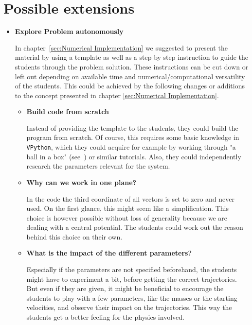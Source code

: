 \documentclass[12pt,ngerman,american]{iopart}
\newcommand{\vpython}[0]{\texttt{VPython}}
\begin{document}
\section{Possible extensions}\label{sec:extensions}

\begin{itemize}

\item \textbf{Explore Problem autonomously}

In chapter~\ref{sec:Numerical Implementation} we suggested to present the material by using a template as well as a step by step instruction to guide the students through the problem solution.
These instructions can be cut down or left out depending on available time and numerical/computational versatility of the students.
This could be achieved by the following changes or additions to the concept presented in chapter \ref{sec:Numerical Implementation}.

\begin{itemize}
\item \textbf{Build code from scratch}

Instead of providing the template to the students, they could build the program from scratch.
Of course, this requires some basic knowledge in \vpython{}, which they could acquire for example by working through "a ball in a box" (see~\cite{VPythonIntro}) or similar tutorials.
Also, they could independently research the parameters relevant for the system.
\item \textbf{Why can we work in one plane?}

In the code the third coordinate of all vectors is set to zero and never used.
On the first glance, this might seem like a simplification.
This choice is however possible without loss of generality because we are dealing with a central potential.
The students could work out the reason behind this choice on their own.
\item \textbf{What is the impact of the different parameters?}

Especially if the parameters are not specified beforehand, the students might have to experiment a bit, before getting the correct trajectories.
But even if they are given, it might be beneficial to encourage the students to play with a few parameters, like the masses or the starting velocities, and observe their impact on the trajectories.
This way the students get a better feeling for the physics involved.
\end{itemize}


\end{itemize}
\end{document}
